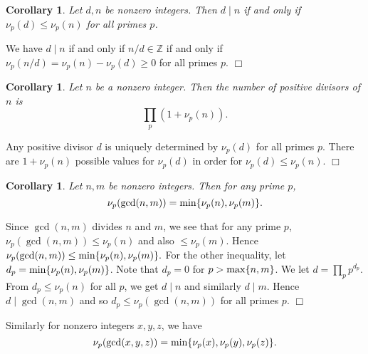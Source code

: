 \documentclass{article}
\def\Z{{\mathbb Z}}
\def\min{{\rm min}}
\def\Z{{\mathbb Z}}
\def\max{{\rm max}}
\newtheorem{cor}[subsection]{Corollary}
\newenvironment{proof}{\noindent {\bf Proof:}}{$\Box$ \vspace{2 ex}}
\begin{document}
\begin{cor}
    Let $d,n$ be nonzero integers. Then $d\mid n$ if and only if $\nu_p(d)\leq\nu_p(n)$ for all primes $p$.
\end{cor}

\begin{proof}
\begin{comment}
    Suppose $d\mid n$. Write $n = de$ for some nonzero integer $e$. Then for any primes $p$, $$\nu_p(n) = \nu_p(d) + \nu_p(d)\geq\nu_p(d).$$
    Conversely, suppose $\nu_p(d)\leq\nu_p(n)$ for all primes $p$. Let $m_p = \nu_p(n) - \nu_p(d)$. Then $m_p\geq 0$ for all primes $p$, and $m_p\leq \nu_p(n) = 0$ for all but finitely primes $p$. Then $m = \prod_p p^{m_p}\in\Z$ and $n = dm$.
\end{comment}
    We have $d\mid n$ if and only if $n/d\in\Z$ if and only if $\nu_p(n/d) = \nu_p(n) - \nu_p(d)\geq0$ for all primes $p$.
\end{proof}

\begin{cor}
    Let $n$ be a nonzero integer. Then the number of positive divisors of $n$ is $$\prod_p (1 + \nu_p(n)).$$
\end{cor}

\begin{proof}
    Any positive divisor $d$ is uniquely determined by $\nu_p(d)$ for all primes $p$. There are $1+\nu_p(n)$ possible values for $\nu_p(d)$ in order for $\nu_p(d)\leq\nu_p(n)$.
\end{proof}

\begin{cor}
    Let $n,m$ be nonzero integers. Then for any prime $p$, $$\nu_p(\gcd(n,m)) = \min\{\nu_p(n),\nu_p(m)\}.$$
\end{cor}

\begin{proof}
    Since $\gcd(n,m)$ divides $n$ and $m$, we see that for any prime $p$, $\nu_p(\gcd(n,m))\leq\nu_p(n)$ and also $\leq\nu_p(m)$. Hence $\nu_p(\gcd(n,m)) \leq \min\{\nu_p(n),\nu_p(m)\}.$ For the other inequality, let $d_p = \min\{\nu_p(n),\nu_p(m)\}$. Note that $d_p = 0$ for $p>\max\{n,m\}$. We let $d = \prod_p p^{d_p}$. From $d_p\leq \nu_p(n)$ for all $p$, we get $d\mid n$ and similarly $d\mid m$. Hence $d\mid \gcd(n,m)$ and so $d_p\leq \nu_p(\gcd(n,m))$ for all primes $p$.
\end{proof}

Similarly for nonzero integers $x,y,z$, we have
$$\nu_p(\gcd(x,y,z)) = \min\{\nu_p(x),\nu_p(y),\nu_p(z)\}.$$
\end{document}
